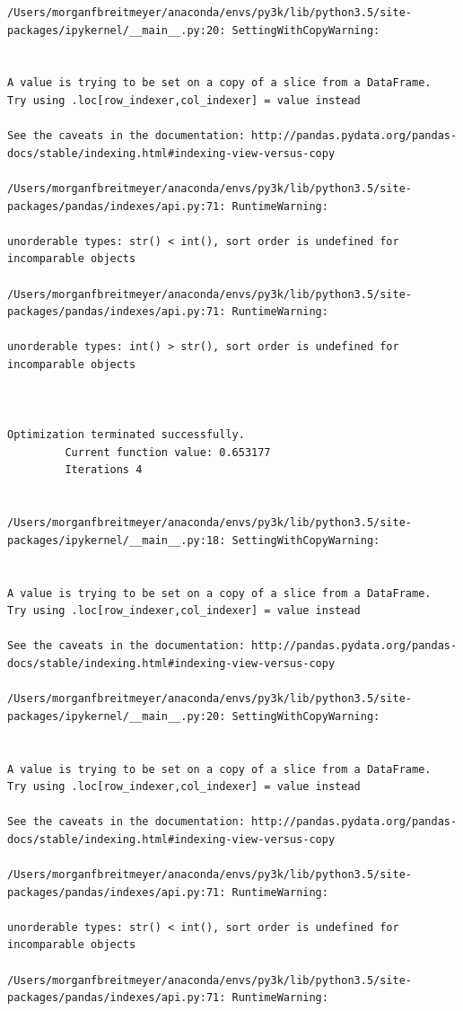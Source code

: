 \begin{lstlisting}
/Users/morganfbreitmeyer/anaconda/envs/py3k/lib/python3.5/site-packages/ipykernel/__main__.py:20: SettingWithCopyWarning:


A value is trying to be set on a copy of a slice from a DataFrame.
Try using .loc[row_indexer,col_indexer] = value instead

See the caveats in the documentation: http://pandas.pydata.org/pandas-docs/stable/indexing.html#indexing-view-versus-copy

/Users/morganfbreitmeyer/anaconda/envs/py3k/lib/python3.5/site-packages/pandas/indexes/api.py:71: RuntimeWarning:

unorderable types: str() < int(), sort order is undefined for incomparable objects

/Users/morganfbreitmeyer/anaconda/envs/py3k/lib/python3.5/site-packages/pandas/indexes/api.py:71: RuntimeWarning:

unorderable types: int() > str(), sort order is undefined for incomparable objects



Optimization terminated successfully.
         Current function value: 0.653177
         Iterations 4


/Users/morganfbreitmeyer/anaconda/envs/py3k/lib/python3.5/site-packages/ipykernel/__main__.py:18: SettingWithCopyWarning:


A value is trying to be set on a copy of a slice from a DataFrame.
Try using .loc[row_indexer,col_indexer] = value instead

See the caveats in the documentation: http://pandas.pydata.org/pandas-docs/stable/indexing.html#indexing-view-versus-copy

/Users/morganfbreitmeyer/anaconda/envs/py3k/lib/python3.5/site-packages/ipykernel/__main__.py:20: SettingWithCopyWarning:


A value is trying to be set on a copy of a slice from a DataFrame.
Try using .loc[row_indexer,col_indexer] = value instead

See the caveats in the documentation: http://pandas.pydata.org/pandas-docs/stable/indexing.html#indexing-view-versus-copy

/Users/morganfbreitmeyer/anaconda/envs/py3k/lib/python3.5/site-packages/pandas/indexes/api.py:71: RuntimeWarning:

unorderable types: str() < int(), sort order is undefined for incomparable objects

/Users/morganfbreitmeyer/anaconda/envs/py3k/lib/python3.5/site-packages/pandas/indexes/api.py:71: RuntimeWarning:


\end{lstlisting}
